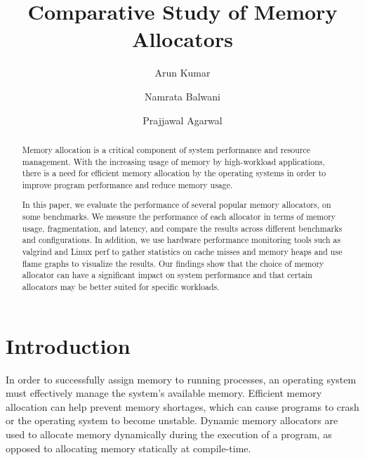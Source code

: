 \documentclass[sigplan,screen]{acmart}
\begin{document}
\title{Comparative Study of Memory Allocators}

\author{Arun Kumar}

\author{Namrata Balwani}

\author{Prajjawal Agarwal}


\begin{abstract}
  Memory allocation is a critical component of system performance and resource management. With the increasing usage of memory by high-workload applications, there is a need for efficient memory allocation by the operating systems in order to improve program performance and reduce memory usage.

    In this paper, we evaluate the performance of several popular memory allocators, on some benchmarks. We measure the performance of each allocator in terms of memory usage, fragmentation, and latency, and compare the results across different benchmarks and configurations. In addition, we use hardware performance monitoring tools such as valgrind and Linux perf to gather statistics on cache misses and memory heaps and use flame graphs to visualize the results. Our findings show that the choice of memory allocator can have a significant impact on system performance and that certain allocators may be better suited for specific workloads.
\end{abstract}




\maketitle


\section{Introduction}
In order to successfully assign memory to running processes, an operating system must effectively manage the system's available memory. Efficient memory allocation can help prevent memory shortages, which can cause programs to crash or the operating system to become unstable. Dynamic memory allocators are used to allocate memory dynamically during the execution of a program, as opposed to allocating memory statically at compile-time. 
\end{document}
